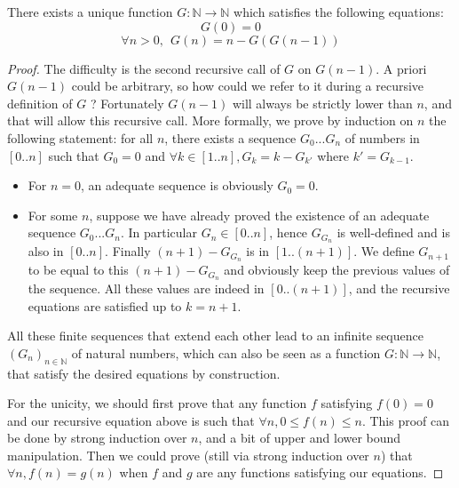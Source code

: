 \documentclass[a4paper,11pt]{article}
\begin{document}
\begin{theorem}\label{defG}There exists a unique function
  $G:\mathbb{N}\to\mathbb{N}$ which satisfies the following
  equations:
  $$G(0) = 0$$
  $$\forall n>0,~~ G(n) = n - G(G(n-1))$$
\end{theorem}
\begin{proof}
The difficulty is the second recursive call of $G$ on $G(n-1)$.
A priori $G(n-1)$ could be arbitrary, so how could we refer to it
during a recursive definition of $G$ ? Fortunately $G(n-1)$ will
always be strictly lower than $n$, and that will allow this recursive
call. More formally, we prove by induction on $n$ the following
statement: for all $n$, there exists a sequence $G_0...G_n$
of numbers in $[0..n]$ such that $G_0=0$ and
$\forall k\in[1..n], G_k = k - G_{k'}$ where $k' = G_{k-1}$.
\begin{itemize}
\item For $n=0$, an adequate sequence is obviously $G_0 = 0$.
\item For some $n$, suppose we have already proved the existence
  of an adequate sequence $G_0...G_n$.
  In particular $G_n \in [0..n]$, hence $G_{G_n}$
  is well-defined and is also in $[0..n]$. Finally $(n+1)-G_{G_n}$
  is in $[1..(n+1)]$. We define $G_{n+1}$ to be equal to this
  $(n+1)-G_{G_n}$ and obviously keep the previous values of the
  sequence. All these values are indeed in $[0..(n+1)]$, and the
  recursive equations are satisfied up to $k=n+1$. 
\end{itemize}
All these finite sequences that extend each other
lead to an infinite sequence $(G_n)_{n\in\mathbb{N}}$ of natural
numbers, which can also be seen as a function
$G:\mathbb{N}\to\mathbb{N}$, that satisfy the desired equations
by construction.

For the unicity, we should first prove that any function $f$
satisfying $f(0)=0$ and our recursive equation above is such that
$\forall n, 0\le f(n)\le n$. This proof can be done by strong
induction over $n$, and a bit of upper and lower bound manipulation.
Then we could prove (still via strong induction
over $n$) that $\forall n, f(n)=g(n)$ when $f$ and $g$
are any functions satisfying our equations. 
\end{proof}
\end{document}
